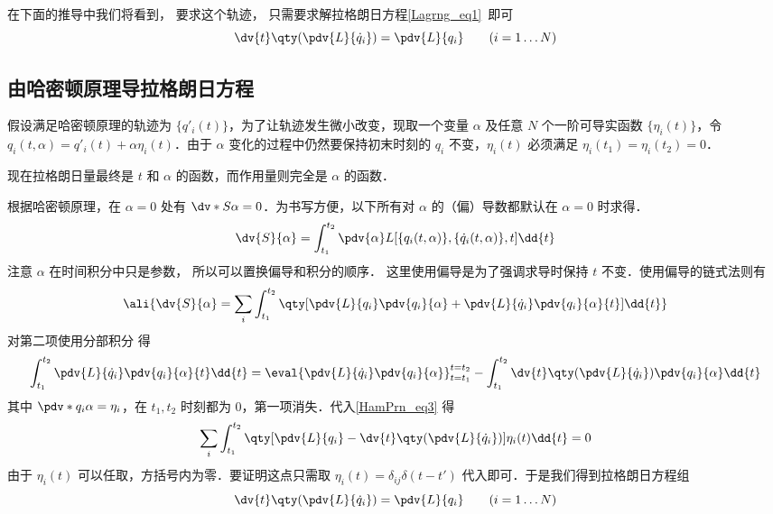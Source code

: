 在下面的推导中我们将看到， 要求这个轨迹， 只需要求解拉格朗日方程\autoref{Lagrng_eq1}~即可
\begin{equation}
\dv{t} \qty(\pdv{L}{\dot q_i}) = \pdv{L}{q_i} \qquad
(i = 1\dots N)
\end{equation}

\subsection{由哈密顿原理导拉格朗日方程}

假设满足哈密顿原理的轨迹为 $\{q'_i(t)\}$，为了让轨迹发生微小改变，现取一个变量 $\alpha$ 及任意 $N$ 个一阶可导实函数 $\{\eta_i(t)\}$，令 $q_i(t,\alpha ) = q'_i(t) + \alpha \eta_i(t)$．由于 $\alpha$ 变化的过程中仍然要保持初末时刻的 $q_i$ 不变，$\eta_i(t)$ 必须满足 $\eta_i(t_1) = \eta_i(t_2) = 0$．

现在拉格朗日量最终是 $t$ 和 $\alpha$ 的函数，而作用量则完全是 $\alpha$ 的函数．
 
根据哈密顿原理，在 $\alpha = 0$ 处有 $\dv*{S}{\alpha} = 0$．为书写方便，以下所有对 $\alpha$ 的（偏）导数都默认在 $\alpha=0$ 时求得．
\begin{equation}
\dv{S}{\alpha} = \int_{t_1}^{t_2} \pdv{\alpha} L[\{q_i(t,\alpha )\}, \{\dot q_i(t,\alpha)\}, t] \dd{t}
\end{equation}
注意 $\alpha$ 在时间积分中只是参数， 所以可以置换偏导和积分的顺序． %
这里使用偏导是为了强调求导时保持 $t$ 不变．使用偏导的链式法则有
\begin{equation}\label{HamPrn_eq3}
\ali{
\dv{S}{\alpha} =
\sum_i \int_{t_1}^{t_2} \qty[\pdv{L}{q_i} \pdv{q_i}{\alpha} + \pdv{L}{\dot q_i}\pdv{q_i}{\alpha}{t}] \dd{t}
}\end{equation}
对第二项使用分部积分 得
\begin{equation}
\int_{t_1}^{t_2} \pdv{L}{\dot q_i} \pdv{q_i}{\alpha}{t} \dd{t}  = \eval{\pdv{L}{\dot q_i}\pdv{q_i}{\alpha}}_{t = t_1}^{t = t_2} - \int_{t_1}^{t_2} \dv{t} \qty(\pdv{L}{\dot q_i})\pdv{q_i}{\alpha} \dd{t}
\end{equation}
其中 $\pdv*{q_i}{\alpha}  = \eta_i$，在 $t_1, t_2$ 时刻都为 0，第一项消失．代入\autoref{HamPrn_eq3} 得
\begin{equation}
\sum_i \int_{t_1}^{t_2} \qty[\pdv{L}{q_i} - \dv{t} \qty(\pdv{L}{\dot q_i})] \eta_i(t) \dd{t} = 0
\end{equation}
由于 $\eta_i(t)$ 可以任取，方括号内为零．要证明这点只需取 $\eta_i(t) = \delta_{ij}\delta(t - t')$ 代入即可．于是我们得到拉格朗日方程组
\begin{equation}\label{HamPrn_eq2}
\dv{t} \qty(\pdv{L}{\dot q_i}) = \pdv{L}{q_i} \qquad
(i = 1\dots N)
\end{equation}

